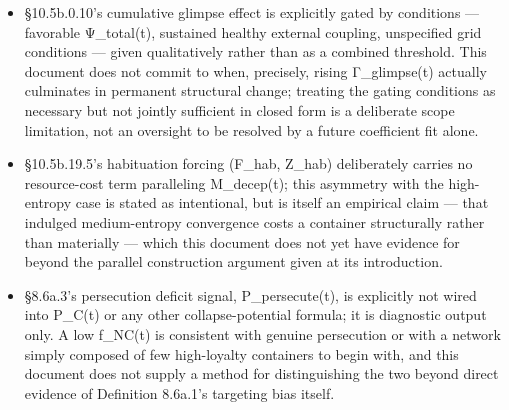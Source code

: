 \documentclass[
]{article}
\begin{document}
\begin{itemize}
  observable even in principle --- it is itself an inferential construct
  in most real domains, not a ground truth an adapter can simply supply.
  Applications of Proposition 10.5b.18.26 and 10.5b.18.29 should treat
  A\_true as the best available reconstruction (forensic, per §16.7,
  where applicable) rather than as a known quantity, and Θ\_capture
  (Definition 10.5b.18.28b) is correspondingly hard to fit with
  confidence wherever A\_true itself is contested.
\item
  §10.5b.0.10's cumulative glimpse effect is explicitly gated by
  conditions --- favorable Ψ\_total(t), sustained healthy external
  coupling, unspecified grid conditions --- given qualitatively rather
  than as a combined threshold. This document does not commit to when,
  precisely, rising Γ\_glimpse(t) actually culminates in permanent
  structural change; treating the gating conditions as necessary but not
  jointly sufficient in closed form is a deliberate scope limitation,
  not an oversight to be resolved by a future coefficient fit alone.
\item
  §10.5b.19.5's habituation forcing (F\_hab, Z\_hab) deliberately
  carries no resource-cost term paralleling M\_decep(t); this asymmetry
  with the high-entropy case is stated as intentional, but is itself an
  empirical claim --- that indulged medium-entropy convergence costs a
  container structurally rather than materially --- which this document
  does not yet have evidence for beyond the parallel construction
  argument given at its introduction.
\item
  §8.6a.3's persecution deficit signal, P\_persecute(t), is explicitly
  not wired into P\_C(t) or any other collapse-potential formula; it is
  diagnostic output only. A low f\_NC(t) is consistent with genuine
  persecution or with a network simply composed of few high-loyalty
  containers to begin with, and this document does not supply a method
  for distinguishing the two beyond direct evidence of Definition
  8.6a.1's targeting bias itself.
\end{itemize}
\end{document}
